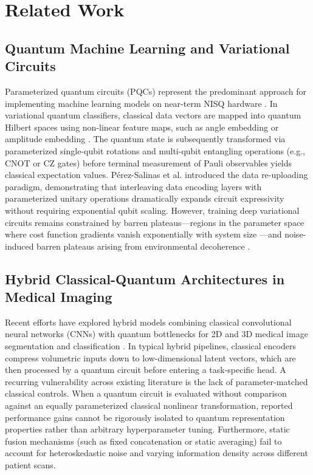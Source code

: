 \section{Related Work}
\label{sec:related_work}

\subsection{Quantum Machine Learning and Variational Circuits}
Parameterized quantum circuits (PQCs) represent the predominant approach for implementing machine learning models on near-term NISQ hardware \cite{cerezo2021variational,preskill2018quantum}. 
In variational quantum classifiers, classical data vectors are mapped into quantum Hilbert spaces using non-linear feature maps, such as angle embedding or amplitude embedding \cite{schuld2021machine}. 
The quantum state is subsequently transformed via parameterized single-qubit rotations and multi-qubit entangling operations (e.g., CNOT or CZ gates) before terminal measurement of Pauli observables yields classical expectation values. 
P{\'e}rez-Salinas et al. \cite{perez2020data} introduced the data re-uploading paradigm, demonstrating that interleaving data encoding layers with parameterized unitary operations dramatically expands circuit expressivity without requiring exponential qubit scaling. 
However, training deep variational circuits remains constrained by barren plateaus---regions in the parameter space where cost function gradients vanish exponentially with system size \cite{mcclean2018barren}---and noise-induced barren plateaus arising from environmental decoherence \cite{wang2021noise}.

\subsection{Hybrid Classical-Quantum Architectures in Medical Imaging}
Recent efforts have explored hybrid models combining classical convolutional neural networks (CNNs) with quantum bottlenecks for 2D and 3D medical image segmentation and classification \cite{bergholm2018pennylane}. 
In typical hybrid pipelines, classical encoders compress volumetric inputs down to low-dimensional latent vectors, which are then processed by a quantum circuit before entering a task-specific head. 
A recurring vulnerability across existing literature is the lack of parameter-matched classical controls. 
When a quantum circuit is evaluated without comparison against an equally parameterized classical nonlinear transformation, reported performance gains cannot be rigorously isolated to quantum representation properties rather than arbitrary hyperparameter tuning. 
Furthermore, static fusion mechanisms (such as fixed concatenation or static averaging) fail to account for heteroskedastic noise and varying information density across different patient scans.

